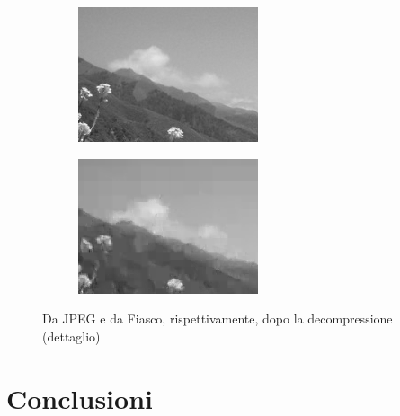 \documentclass[11pt,a4paper,appendixprefix=true,numbers=noenddot]{scrreprt}
\begin{document}
\begin{figure}[!ht]
    \begin{subfigure}[b]{0.47\textwidth}
    \includegraphics[width=\textwidth]{images/california-coast-jpeg-detail2.png}
    \end{subfigure}
    \begin{subfigure}[b]{0.47\textwidth}
        \includegraphics[width=\textwidth]{images/california-coast-fiasco-detail2.png}
    \end{subfigure}
    \caption{ Da JPEG e da Fiasco, rispettivamente, dopo la decompressione (dettaglio)}
\end{figure}

\FloatBarrier

\section{Conclusioni}
\end{document}
